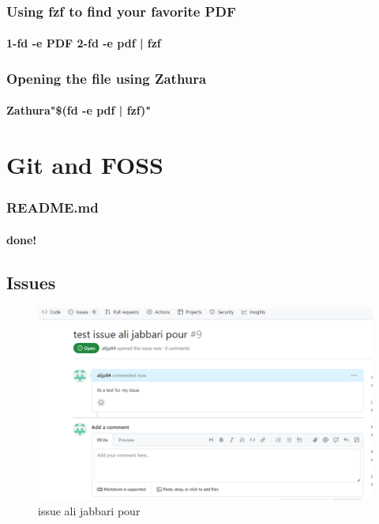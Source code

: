 \documentclass[titlepage]{article}
\begin{document}
\subsubsection{Using fzf to find your favorite PDF}
\paragraph{1-fd -e PDF 2-fd -e pdf | fzf}
\subsubsection{Opening the file using Zathura}
\paragraph{Zathura"\$(fd -e pdf | fzf)"}
\section{Git and FOSS}
\subsubsection{README.md}
\paragraph{done!}
\subsection{Issues}
\begin {figure}[ht]
\centering
\includegraphics[width=1\textwidth]{screne issue.png}
\caption{issue ali jabbari pour}
\end{figure}
\end{document}
